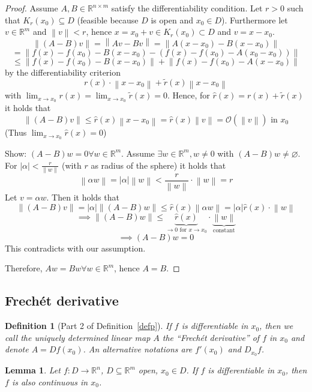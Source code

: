 \documentclass{article}
\newtheorem{definition}{Definition}  \numberwithin{definition}{section}
\newtheorem{lemma}{Lemma}  \numberwithin{lemma}{section}
\newcommand{\norm}[1]{\left\|#1\right\|}
\newcommand{\card}[1]{\left|#1\right|}
\begin{document}
\begin{proof}
  Assume $A, B \in \mathbb R^{n\times m}$ satisfy the differentiability condition.
  Let $r > 0$ such that $K_r(x_0) \subseteq D$ (feasible because $D$ is open and $x_0 \in D$).
  Furthermore let $v \in \mathbb R^m$ and $\norm{v} < r$, hence $x = x_0 + v \in K_r(x_0) \subset D$
  and $v = x - x_0$.
  \[ \norm{(A - B) v} = \norm{Av - Bv} = \norm{A(x - x_0) - B(x - x_0)} \]
  \[ = \norm{f(x) - f(x_0) - B(x - x_0) - (f(x) - f(x_0) - A(x_0 - x_0))} \]
  \[ \leq \norm{f(x) - f(x_0) - B(x - x_0)} + \norm{f(x) - f(x_0) - A(x - x_0)} \]
  by the differentiability criterion
  \[ r(x) \cdot \norm{x - x_0} + \tilde r(x) \norm{x - x_0} \]
  with $\lim_{x\to x_0} r(x) = \lim_{x\to x_0} \tilde r(x) = 0$. Hence, for $\hat r(x) = r(x) + \tilde r(x)$ it holds that
  \[ \norm{(A - B) v} \leq \hat r(x) \norm{x - x_0} = \hat r(x) \norm{v} = \mathcal O(\norm{v}) \text{ in } x_0 \]
  (Thus $\lim_{x\to x_0} \hat r(x) = 0$)

  Show: $(A - B)w = 0 \forall w \in \mathbb R^m$. Assume $\exists w \in \mathbb R^m, w \neq 0$ with $(A - B)w \neq \diameter$.
  For $\card{\alpha} < \frac r{\norm{w}}$ (with $r$ as radius of the sphere) it holds that
  \[ \norm{\alpha w} = \card{\alpha} \norm{w} < \frac{r}{\norm{w}} \cdot \norm{w} = r \]
  Let $v = \alpha w$. Then it holds that
  \[ \norm{(A - B) v} = \card{\alpha} \norm{(A - B) w} \leq \hat r(x) \norm{\alpha w} = \card{\alpha} \hat r(x) \cdot \norm{w} \]
  \[ \implies \norm{(A - B) w} \leq \underbrace{\hat r(x)}_{\to 0 \text{ for } x \to x_0} \cdot \underbrace{\norm w}_{\text{constant}} \]
  \[ \implies (A - B) w = 0 \]
  This contradicts with our assumption.

  Therefore, $Aw = Bw \forall w \in \mathbb R^m$, hence $A = B$.
\end{proof}

\subsection{Frech\'et derivative}
\begin{definition}[Part 2 of Definition~\ref{defp}] %
  If $f$ is differentiable in $x_0$, then we call the uniquely determined linear map $A$ the \enquote{Frech\'et derivative} of $f$ in $x_0$
  and denote $A = Df(x_0)$. An alternative notations are $f'(x_0)$ and $D_{x_0}f$.
\end{definition}

\begin{lemma} %
  Let $f: D \to \mathbb R^n$, $D \subseteq \mathbb R^m$ open, $x_0 \in D$.
  If $f$ is differentiable in $x_0$, then $f$ is also continuous in $x_0$.
\end{lemma}
\end{document}
